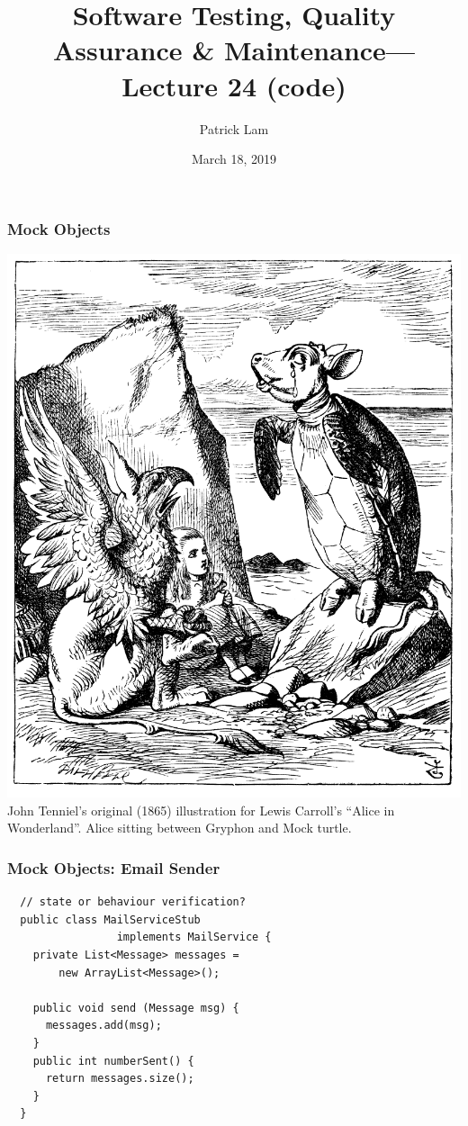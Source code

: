 \documentclass{beamer}
\title{Software Testing, Quality Assurance \& Maintenance---Lecture 24 (code)}
\author{Patrick Lam}
\date{March 18, 2019}
\newenvironment{changemargin}[1]{%
  \begin{list}{}{%
    \setlength{\topsep}{0pt}%
    \setlength{\leftmargin}{#1}%
    \setlength{\rightmargin}{1em}
    \setlength{\listparindent}{\parindent}%
    \setlength{\itemindent}{\parindent}%
    \setlength{\parsep}{\parskip}%
  }%
  \item[]}{\end{list}}
\begin{document}
\begin{frame}
  \titlepage
\end{frame}

\begin{frame}
  \frametitle{Mock Objects}
  \begin{center}
    \includegraphics[height=.8\textheight]{L24/Alice_par_John_Tenniel_34.png}\\
John Tenniel's original (1865) illustration for Lewis Carroll's ``Alice in Wonderland''. Alice sitting between Gryphon and Mock turtle.
  \end{center}
\end{frame}


\begin{frame}[fragile]
  \frametitle{Mock Objects: Email Sender}
  \begin{changemargin}{1cm}
{\small
  \begin{lstlisting}
  // state or behaviour verification?
  public class MailServiceStub
                 implements MailService {
    private List<Message> messages =
        new ArrayList<Message>();
    
    public void send (Message msg) {
      messages.add(msg);
    }
    public int numberSent() {
      return messages.size();
    }
  }     
\end{lstlisting}
}
  \end{changemargin}
\end{frame}
\end{document}
